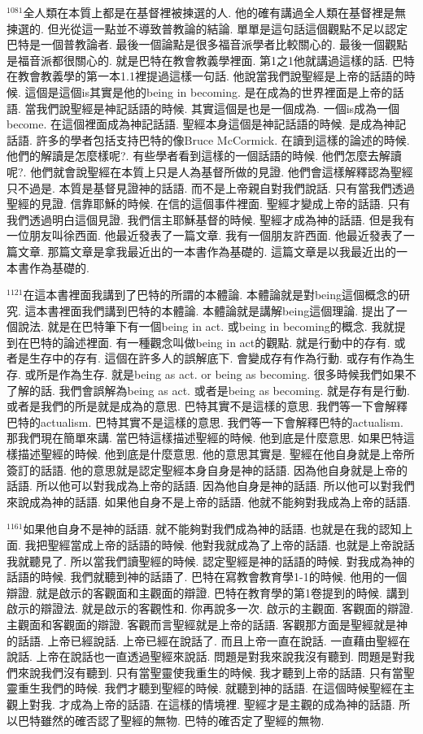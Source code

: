 \documentclass{book}
\begin{document}
$^{1081}$全人類在本質上都是在基督裡被揀選的人.
他的確有講過全人類在基督裡是無揀選的.
但光從這一點並不導致普教論的結論.
單單是這句話這個觀點不足以認定巴特是一個普教論者.
最後一個論點是很多福音派學者比較關心的.
最後一個觀點是福音派都很關心的.
就是巴特在教會教義學裡面.
第1之1他就講過這樣的話.
巴特在教會教義學的第一本1.1裡提過這樣一句話.
他說當我們說聖經是上帝的話語的時候.
這個是這個is其實是他的being in becoming.
是在成為的世界裡面是上帝的話語.
當我們說聖經是神記話語的時候.
其實這個是也是一個成為.
一個is成為一個become.
在這個裡面成為神記話語.
聖經本身這個是神記話語的時候.
是成為神記話語.
許多的學者包括支持巴特的像Bruce McCormick.
在讀到這樣的論述的時候.
他們的解讀是怎麼樣呢?.
有些學者看到這樣的一個話語的時候.
他們怎麼去解讀呢?.
他們就會說聖經在本質上只是人為基督所做的見證.
他們會這樣解釋認為聖經只不過是.
本質是基督見證神的話語.
而不是上帝親自對我們說話.
只有當我們透過聖經的見證.
信靠耶穌的時候.
在信的這個事件裡面.
聖經才變成上帝的話語.
只有我們透過明白這個見證.
我們信主耶穌基督的時候.
聖經才成為神的話語.
但是我有一位朋友叫徐西面.
他最近發表了一篇文章.
我有一個朋友許西面.
他最近發表了一篇文章.
那篇文章是拿我最近出的一本書作為基礎的.
這篇文章是以我最近出的一本書作為基礎的.

$^{1121}$在這本書裡面我講到了巴特的所謂的本體論.
本體論就是對being這個概念的研究.
這本書裡面我們講到巴特的本體論.
本體論就是講解being這個理論.
提出了一個說法.
就是在巴特筆下有一個being in act.
或being in becoming的概念.
我就提到在巴特的論述裡面.
有一種觀念叫做being in act的觀點.
就是行動中的存有.
或者是生存中的存有.
這個在許多人的誤解底下.
會變成存有作為行動.
或存有作為生存.
或所是作為生存.
就是being as act.
or being as becoming.
很多時候我們如果不了解的話.
我們會誤解為being as act.
或者是being as becoming.
就是存有是行動.
或者是我們的所是就是成為的意思.
巴特其實不是這樣的意思.
我們等一下會解釋巴特的actualism.
巴特其實不是這樣的意思.
我們等一下會解釋巴特的actualism.
那我們現在簡單來講.
當巴特這樣描述聖經的時候.
他到底是什麼意思.
如果巴特這樣描述聖經的時候.
他到底是什麼意思.
他的意思其實是.
聖經在他自身就是上帝所簽訂的話語.
他的意思就是認定聖經本身自身是神的話語.
因為他自身就是上帝的話語.
所以他可以對我成為上帝的話語.
因為他自身是神的話語.
所以他可以對我們來說成為神的話語.
如果他自身不是上帝的話語.
他就不能夠對我成為上帝的話語.

$^{1161}$如果他自身不是神的話語.
就不能夠對我們成為神的話語.
也就是在我的認知上面.
我把聖經當成上帝的話語的時候.
他對我就成為了上帝的話語.
也就是上帝說話我就聽見了.
所以當我們讀聖經的時候.
認定聖經是神的話語的時候.
對我成為神的話語的時候.
我們就聽到神的話語了.
巴特在寫教會教育學1-1的時候.
他用的一個辯證.
就是啟示的客觀面和主觀面的辯證.
巴特在教育學的第1卷提到的時候.
講到啟示的辯證法.
就是啟示的客觀性和.
你再說多一次.
啟示的主觀面.
客觀面的辯證.
主觀面和客觀面的辯證.
客觀而言聖經就是上帝的話語.
客觀那方面是聖經就是神的話語.
上帝已經說話.
上帝已經在說話了.
而且上帝一直在說話.
一直藉由聖經在說話.
上帝在說話也一直透過聖經來說話.
問題是對我來說我沒有聽到.
問題是對我們來說我們沒有聽到.
只有當聖靈使我重生的時候.
我才聽到上帝的話語.
只有當聖靈重生我們的時候.
我們才聽到聖經的時候.
就聽到神的話語.
在這個時候聖經在主觀上對我.
才成為上帝的話語.
在這樣的情境裡.
聖經才是主觀的成為神的話語.
所以巴特雖然的確否認了聖經的無物.
巴特的確否定了聖經的無物.
\end{document}
